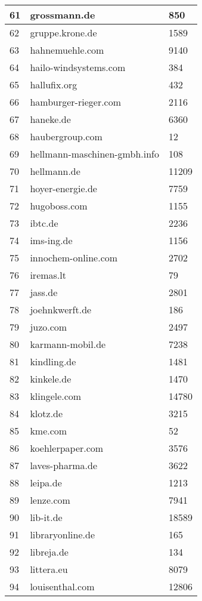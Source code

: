 \begin{longtable}{|m{0.5cm}||m{8cm}|m{5cm}|}
	\hline
	61 & grossmann.de & 850\\
	\hline
	62 & gruppe.krone.de & 1589\\
	\hline
	63 & hahnemuehle.com & 9140\\
	\hline
	64 & hailo-windsystems.com & 384\\
	\hline
	65 & hallufix.org & 432\\
	\hline
	66 & hamburger-rieger.com & 2116\\
	\hline
	67 & haneke.de & 6360\\
	\hline
	68 & haubergroup.com & 12\\
	\hline
	69 & hellmann-maschinen-gmbh.info & 108\\
	\hline
	70 & hellmann.de & 11209\\
	\hline
	71 & hoyer-energie.de & 7759\\
	\hline
	72 & hugoboss.com & 1155\\
	\hline
	73 & ibtc.de & 2236\\
	\hline
	74 & ims-ing.de & 1156\\
	\hline
	75 & innochem-online.com & 2702\\
	\hline
	76 & iremas.lt & 79\\
	\hline
	77 & jass.de & 2801\\
	\hline
	78 & joehnkwerft.de & 186\\
	\hline
	79 & juzo.com & 2497\\
	\hline
	80 & karmann-mobil.de & 7238\\
	\hline
	81 & kindling.de & 1481\\
	\hline
	82 & kinkele.de & 1470\\
	\hline
	83 & klingele.com & 14780\\
	\hline
	84 & klotz.de & 3215\\
	\hline
	85 & kme.com & 52\\
	\hline
	86 & koehlerpaper.com & 3576\\
	\hline
	87 & laves-pharma.de & 3622\\
	\hline
	88 & leipa.de & 1213\\
	\hline
	89 & lenze.com & 7941\\
	\hline
	90 & lib-it.de & 18589\\
	\hline
	91 & libraryonline.de & 165\\
	\hline
	92 & libreja.de & 134\\
	\hline
	93 & littera.eu & 8079\\
	\hline
	94 & louisenthal.com & 12806\\
	\hline

\end{longtable}

